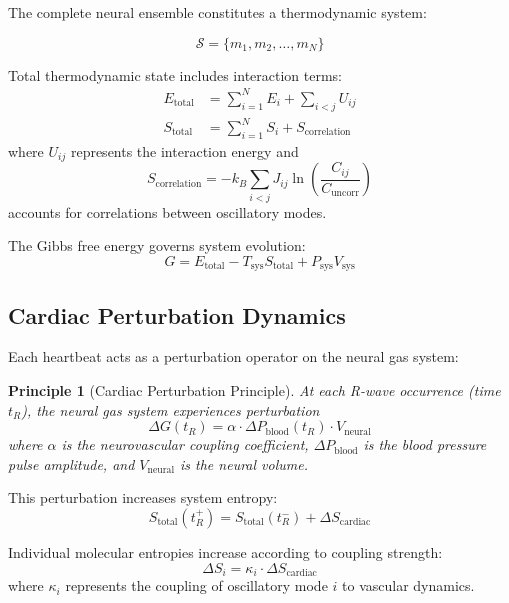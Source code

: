 \documentclass[12pt]{article}
\newtheorem{principle}[theorem]{Principle}
\theoremstyle{remark}
\begin{document}
The complete neural ensemble constitutes a thermodynamic system:

\begin{equation}
\mathcal{S} = \{m_1, m_2, \ldots, m_N\}
\end{equation}

Total thermodynamic state includes interaction terms:
\begin{align}
E_{\text{total}} &= \sum_{i=1}^N E_i + \sum_{i<j} U_{ij}\\
S_{\text{total}} &= \sum_{i=1}^N S_i + S_{\text{correlation}}
\end{align}
where $U_{ij}$ represents the interaction energy and
\begin{equation}
S_{\text{correlation}} = -k_B \sum_{i<j} J_{ij} \ln\left(\frac{C_{ij}}{C_{\text{uncorr}}}\right)
\end{equation}
accounts for correlations between oscillatory modes.

The Gibbs free energy governs system evolution:
\begin{equation}
G = E_{\text{total}} - T_{\text{sys}} S_{\text{total}} + P_{\text{sys}} V_{\text{sys}}
\label{eq:gibbs_energy}
\end{equation}

\subsection{Cardiac Perturbation Dynamics}

Each heartbeat acts as a perturbation operator on the neural gas system:

\begin{principle}[Cardiac Perturbation Principle]
At each R-wave occurrence (time $t_R$), the neural gas system experiences perturbation
\begin{equation}
\Delta G(t_R) = \alpha \cdot \Delta P_{\text{blood}}(t_R) \cdot V_{\text{neural}}
\label{eq:cardiac_perturbation}
\end{equation}
where $\alpha$ is the neurovascular coupling coefficient, $\Delta P_{\text{blood}}$ is the blood pressure pulse amplitude, and $V_{\text{neural}}$ is the neural volume.
\end{principle}

This perturbation increases system entropy:
\begin{equation}
S_{\text{total}}(t_R^+) = S_{\text{total}}(t_R^-) + \Delta S_{\text{cardiac}}
\end{equation}

Individual molecular entropies increase according to coupling strength:
\begin{equation}
\Delta S_i = \kappa_i \cdot \Delta S_{\text{cardiac}}
\end{equation}
where $\kappa_i$ represents the coupling of oscillatory mode $i$ to vascular dynamics.
\end{document}

